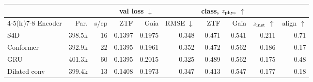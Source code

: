 \begin{tabular}{l r r r r r r r r r}
\toprule
& & & \multicolumn{2}{c}{val loss $\downarrow$} & & \multicolumn{2}{c}{class, $z_{\mathrm{phys}}$ $\uparrow$} & & \\
\cmidrule(lr){4-5}\cmidrule(lr){7-8}
Encoder & Par. & s/ep & ZTF & Gaia & RMSE $\downarrow$ & ZTF & Gaia & $z_{\mathrm{inst}}$ $\uparrow$ & align $\uparrow$ \\
\midrule
S4D & 398.5k & 16 & 0.1397 & 0.1975 & 0.348 & 0.471 & 0.541 & 0.211 & 0.71 \\
Conformer & 392.9k & 22 & 0.1395 & 0.1961 & 0.352 & 0.472 & 0.562 & 0.186 & 0.17 \\
GRU & 401.3k & 60 & 0.1395 & 0.2015 & 0.325 & 0.489 & 0.562 & 0.175 & 0.48 \\
Dilated conv & 399.4k & 13 & 0.1408 & 0.1973 & 0.347 & 0.413 & 0.547 & 0.177 & 0.18 \\
\bottomrule
\end{tabular}
